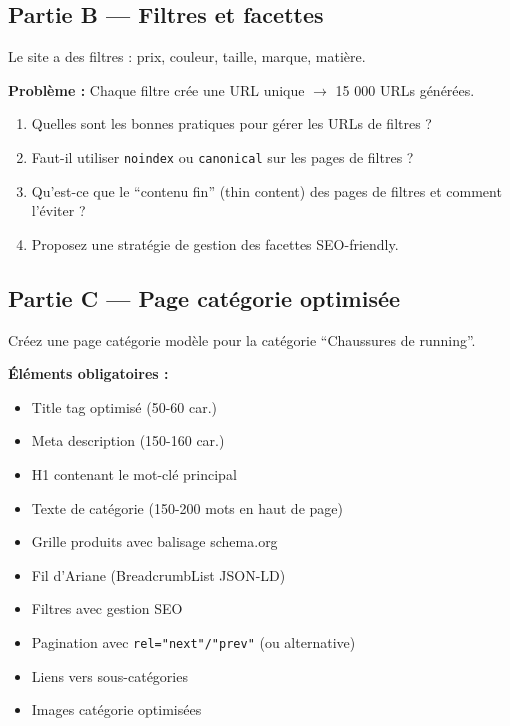 \documentclass[12pt,a4paper]{report}
\begin{document}
\subsection{Partie B --- Filtres et facettes}

Le site a des filtres : prix, couleur, taille, marque, matière.

\textbf{Problème :} Chaque filtre crée une URL unique $\rightarrow$ 15 000 URLs générées.

\begin{enumerate}
\item Quelles sont les bonnes pratiques pour gérer les URLs de filtres ?
\item Faut-il utiliser \texttt{noindex} ou \texttt{canonical} sur les pages de filtres ?
\item Qu'est-ce que le ``contenu fin'' (thin content) des pages de filtres et comment l'éviter ?
\item Proposez une stratégie de gestion des facettes SEO-friendly.
\end{enumerate}

\subsection{Partie C --- Page catégorie optimisée}

Créez une page catégorie modèle pour la catégorie ``Chaussures de running''.

\textbf{Éléments obligatoires :}
\begin{itemize}
\item[$\square$] Title tag optimisé (50-60 car.)
\item[$\square$] Meta description (150-160 car.)
\item[$\square$] H1 contenant le mot-clé principal
\item[$\square$] Texte de catégorie (150-200 mots en haut de page)
\item[$\square$] Grille produits avec balisage schema.org
\item[$\square$] Fil d'Ariane (BreadcrumbList JSON-LD)
\item[$\square$] Filtres avec gestion SEO
\item[$\square$] Pagination avec \texttt{rel="next"/"prev"} (ou alternative)
\item[$\square$] Liens vers sous-catégories
\item[$\square$] Images catégorie optimisées
\end{itemize}
\end{document}
